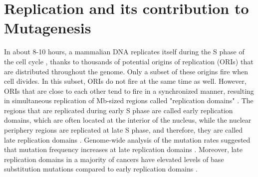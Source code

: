 \section{Replication and its contribution to Mutagenesis}

In about 8-10 hours, a mammalian DNA replicates itself during the S phase of the cell cycle \citep{takebayashi2017anatomy}, thanks to thousands of potential origins of replication (ORIs) that are distributed throughout the genome. Only a subset of these origins fire when cell divides. In this subset, ORIs do not fire at the same time as well. However, ORIs that are close to each other tend to fire in a synchronized manner, resulting in simultaneous replication of Mb-sized regions called "replication domains" \citep{jackson1998replicon}. The regions that are replicated during early S phase are called early replication domains, which are often located at the interior of the nucleus, while the nuclear periphery regions are replicated at late S phase, and therefore, they are called late replication domains \citep{dimitrova2002spatio,farkash2008global,hansen2010sequencing,hiratani2008global,koren2014genetic,nakayasu1989mapping,o1992dynamic}. Genome-wide analysis of the mutation rates suggested that mutation frequency increases at late replication domains \citep{lawrence2013mutational,stamatoyannopoulos2009human}. Moreover, late replication domains in a majority of cancers have elevated levels of base substitution mutations compared to early replication domains \citep{schuster2012chromatin}. 

